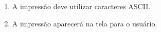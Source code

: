 
\begin{enumerate}
    \item A impressão deve utilizar caracteres ASCII.
    \item A impressão aparecerá na tela para o usuário.
\end{enumerate}

